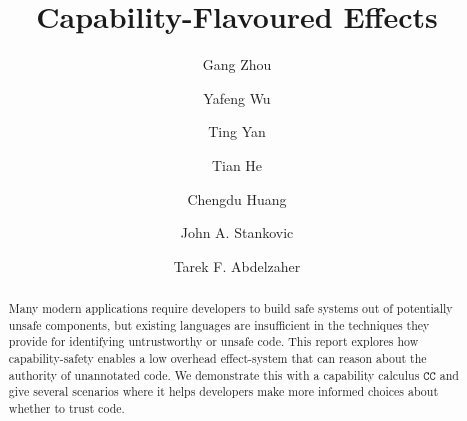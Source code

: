 \documentclass[acmlarge]{acmart}
\newcommand{\kwa}[1]{\mathtt{#1}}
\newcommand{\epscalc}{\kwa{CC}}
\begin{document}
\title{Capability-Flavoured Effects} 







\author{Gang Zhou}
  
\author{Yafeng Wu}

\author{Ting Yan}

\author{Tian He}
  
\author{Chengdu Huang}

\author{John A. Stankovic}

\author{Tarek F. Abdelzaher}


\begin{abstract}
  Many modern applications require developers to build safe systems
  out of potentially unsafe components, but existing languages are
  insufficient in the techniques they provide for identifying
  untrustworthy or unsafe code. This report explores how
  capability-safety enables a low overhead effect-system
  that can reason about the authority of unannotated code.
  We demonstrate this with a capability calculus $\epscalc$ and
  give several scenarios where it helps developers make more
  informed choices about whether to trust code.
\end{abstract}





\end{document}
